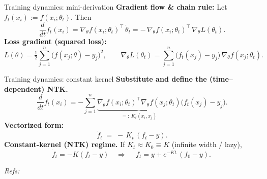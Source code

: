 \documentclass[10pt,aspectratio=169]{beamer}
\begin{document}
\begin{frame}{Training dynamics: mini-derivation}
	\textbf{Gradient flow \& chain rule:} Let $f_t(x_i):=f(x_i;\theta_t)$. Then
	\[
		\frac{d}{dt} f_t(x_i)
		= \nabla_\theta f(x_i;\theta_t)^{\top}\,\dot{\theta}_t
		= -\,\nabla_\theta f(x_i;\theta_t)^{\top}\,\nabla_\theta L(\theta_t).
	\]
	\pause
	\textbf{Loss gradient (squared loss):}
	\[
		L(\theta)=\tfrac{1}{2}\sum_{j=1}^n \big(f(x_j;\theta)-y_j\big)^2,
		\qquad
		\nabla_\theta L(\theta_t)
		= \sum_{j=1}^n \big(f_t(x_j)-y_j\big)\,\nabla_\theta f(x_j;\theta_t).
	\]
\end{frame}

\begin{frame}{Training dynamics: constant kernel}
	\textbf{Substitute and define the (time–dependent) NTK.}
	\[
		\frac{d}{dt} f_t(x_i)
		= -\sum_{j=1}^n \underbrace{\nabla_\theta f(x_i;\theta_t)^{\top}\nabla_\theta f(x_j;\theta_t)}_{=:~K_t(x_i,x_j)}
		\big(f_t(x_j)-y_j\big).
	\]
	\pause
	\textbf{Vectorized form:}
	\[
		\boxed{~\dot f_t \;=\; -\,K_t\,(f_t-y).~}
	\]
	\pause
	\textbf{Constant-kernel (NTK) regime.} If $K_t \approx K_0 \equiv K$ (infinite width / lazy),
	\[
		\dot f_t = -K(f_t-y)
		\quad\Rightarrow\quad
		\boxed{~f_t = y + e^{-Kt}\,(f_0-y).~}
	\]

	\vspace{0.4em}
	\footnotesize \emph{Refs:} \citep{jacot2018ntk,lee2019wide}\normalsize

\end{frame}
\end{document}
